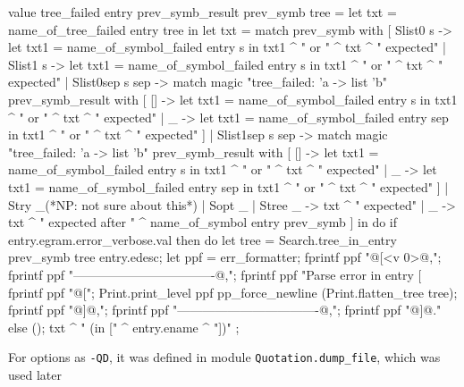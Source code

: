 \begin{ocamlcode}
value tree_failed entry prev_symb_result prev_symb tree =
  let txt = name_of_tree_failed entry tree in
  let txt =
    match prev_symb with
    [ Slist0 s ->
        let txt1 = name_of_symbol_failed entry s in
        txt1 ^ " or " ^ txt ^ " expected"
    | Slist1 s ->
        let txt1 = name_of_symbol_failed entry s in
        txt1 ^ " or " ^ txt ^ " expected"
    | Slist0sep s sep ->
        match magic "tree_failed: 'a -> list 'b" prev_symb_result with
        [ [] ->
            let txt1 = name_of_symbol_failed entry s in
            txt1 ^ " or " ^ txt ^ " expected"
        | _ ->
            let txt1 = name_of_symbol_failed entry sep in
            txt1 ^ " or " ^ txt ^ " expected" ]
    | Slist1sep s sep ->
        match magic "tree_failed: 'a -> list 'b" prev_symb_result with
        [ [] ->
            let txt1 = name_of_symbol_failed entry s in
            txt1 ^ " or " ^ txt ^ " expected"
        | _ ->
            let txt1 = name_of_symbol_failed entry sep in
            txt1 ^ " or " ^ txt ^ " expected" ]
    | Stry _(*NP: not sure about this*) | Sopt _ | Stree _ -> txt ^ " expected"
    | _ -> txt ^ " expected after " ^ name_of_symbol entry prev_symb ]
  in
  do {
    if entry.egram.error_verbose.val then do {
      let tree = Search.tree_in_entry prev_symb tree entry.edesc;
      let ppf = err_formatter;
      fprintf ppf "@[<v 0>@,";
      fprintf ppf "----------------------------------@,";
      fprintf ppf "Parse error in entry [%
      fprintf ppf "@[";
      Print.print_level ppf pp_force_newline (Print.flatten_tree tree);
      fprintf ppf "@]@,";
      fprintf ppf "----------------------------------@,";
      fprintf ppf "@]@."
    }
    else ();
    txt ^ " (in [" ^ entry.ename ^ "])"
  }
;  
\end{ocamlcode}

For options as \verb|-QD|, it was defined in module
\verb|Quotation.dump_file|, which was used later

